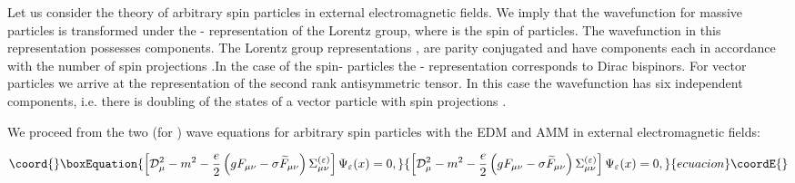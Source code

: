 \documentclass[a4paper,12pt]{article}
\begin{document}
Let us consider the theory of arbitrary spin particles in external
electromagnetic fields. We imply that the wavefunction for massive particles
is transformed under the \coordHE{} - representation of the Lorentz
group, where \coordHE{} is the spin of particles. The wavefunction in this
representation possesses \coordHE{} components. The Lorentz group
representations \coordHE{}, \coordHE{} are parity conjugated and have \coordHE{}
components each in accordance with the number of spin projections \coordHE{} .In the case of the spin-\coordHE{} particles the \coordHE{} - representation corresponds to Dirac bispinors. For vector
particles we arrive at the representation \coordHE{} of the second
rank antisymmetric tensor. In this case the wavefunction has six independent
components, i.e. there is doubling of the states of a vector particle with
spin projections \coordHE{}.

We proceed from the two (for \coordHE{}) wave equations for
arbitrary spin particles with the EDM and AMM in external electromagnetic
fields:

\begin{equation}\coord{}\boxEquation{
\left[ \mathcal{D}_\mu ^2-m^2-\frac e2\left( gF_{\mu \nu }-\sigma \widetilde{
F}_{\mu \nu }\right) \Sigma _{\mu \nu }^{(\varepsilon )}\right] \Psi
_\varepsilon (x)=0,  \label{1}
}{
\left[ \mathcal{D}_\mu ^2-m^2-\frac e2\left( gF_{\mu \nu }-\sigma \widetilde{
F}_{\mu \nu }\right) \Sigma _{\mu \nu }^{(\varepsilon )}\right] \Psi
_\varepsilon (x)=0,  }{ecuacion}\coordE{}\end{equation}
\end{document}
